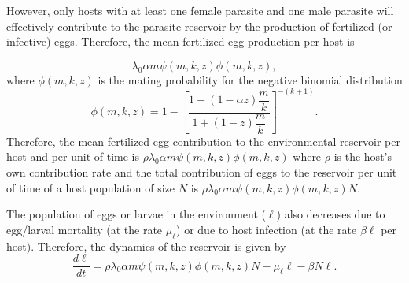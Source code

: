 \documentclass[eng]{MMSB-class-eng}
\begin{document}
However, only hosts with at least one female parasite and one male parasite will effectively contribute to the parasite reservoir by the production of fertilized (or infective) eggs. 
Therefore, the mean fertilized egg production per host is

\begin{equation}\label{meanfertilizedeggs}
\lambda_0
\alpha m
\psi(m,k,z)\phi(m,k,z),
\end{equation} 
where $\phi(m,k,z)$ is the mating probability for the negative binomial distribution \citet{lopez2022general}
\begin{equation}\label{phi}
\phi(m,k,z)=1-\left[ \frac{1+ \left( 1-
	\alpha z
	\right) \dfrac{m}{k}}{1+(1-z)\dfrac{m}{k}}\right] ^{-(k+1)}.
\end{equation}
Therefore, the mean fertilized egg contribution to the environmental reservoir  per host and per unit of time is
$\rho\lambda_0
\alpha m
\psi(m,k,z) \phi(m,k,z)$ where $\rho$ 
is the host's own contribution rate and the total contribution of eggs to the reservoir per unit of time of a host population of size $N$ is 
$\rho\lambda_0
\alpha m
\psi(m,k,z) \phi(m,k,z) N$. 

The population of eggs or larvae in the environment ($\ell$) also decreases due to egg/larval mortality (at the rate $\mu_{\ell}$) or due to host infection (at the rate $\beta \ell$ per host). 
Therefore, the dynamics of the reservoir is given by
\begin{equation}\label{eqreservorio}
\dfrac{d\ell}{dt}= \rho\lambda_0
\alpha m
\psi(m,k,z) \phi(m,k,z) N- \mu_{\ell} \ell -\beta N \ell.
\end{equation}
\end{document}
